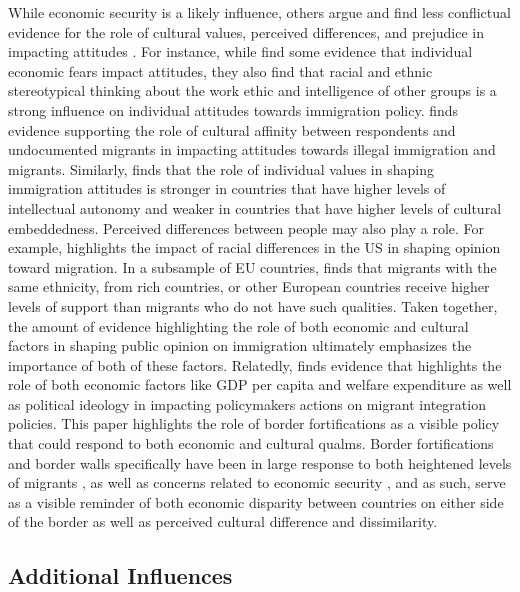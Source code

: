 \documentclass[12pt,]{article}
\begin{document}
While economic security is a likely influence, others argue and find
less conflictual evidence for the role of cultural values, perceived
differences, and prejudice in impacting attitudes
\citep{heath2020, heath2020a}. For instance, while \citet{burns2000}
find some evidence that individual economic fears impact attitudes, they
also find that racial and ethnic stereotypical thinking about the work
ethic and intelligence of other groups is a strong influence on
individual attitudes towards immigration policy. \citet{espenshade1993}
finds evidence supporting the role of cultural affinity between
respondents and undocumented migrants in impacting attitudes towards
illegal immigration and migrants. Similarly, \citet{davidov2020} finds
that the role of individual values in shaping immigration attitudes is
stronger in countries that have higher levels of intellectual autonomy
and weaker in countries that have higher levels of cultural
embeddedness. Perceived differences between people may also play a role.
For example, \citet{ayers2009} highlights the impact of racial
differences in the US in shaping opinion toward migration. In a
subsample of EU countries, \citet{deconinck2020} finds that migrants
with the same ethnicity, from rich countries, or other European
countries receive higher levels of support than migrants who do not have
such qualities. Taken together, the amount of evidence highlighting the
role of both economic and cultural factors in shaping public opinion on
immigration ultimately emphasizes the importance of both of these
factors. Relatedly, \citet{solano2023} finds evidence that highlights
the role of both economic factors like GDP per capita and welfare
expenditure as well as political ideology in impacting policymakers
actions on migrant integration policies. This paper highlights the role
of border fortifications as a visible policy that could respond to both
economic and cultural qualms. Border fortifications and border walls
specifically have been in large response to both heightened levels of
migrants \citep{avdan2023}, as well as concerns related to economic
security \citep{carter2017}, and as such, serve as a visible reminder of
both economic disparity between countries on either side of the border
as well as perceived cultural difference and dissimilarity.

\subsection{Additional Influences}\label{additional-influences}
\end{document}
